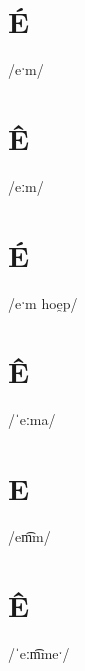 \documentclass[10pt,a4paper,twoside]{book}
\begin{document}
\section*{É}

\begin{multicols}{3}
 {/eˑm/} {}
\end{multicols}

\section*{Ê}

\begin{multicols}{3}
 {/eːm/} {}
\end{multicols}

\section*{É}

\begin{multicols}{3}
 {/eˑm hoe̯p/} {}
\end{multicols}

\section*{Ê}

\begin{multicols}{3}
 {/ˈeːma/} {}
\end{multicols}

\section*{E}

\begin{multicols}{3}
 {/em͡m/} {}
\end{multicols}

\section*{Ê}

\begin{multicols}{3}
 {/ˈeːm͡meˑ/} {}
\end{multicols}
\end{document}
